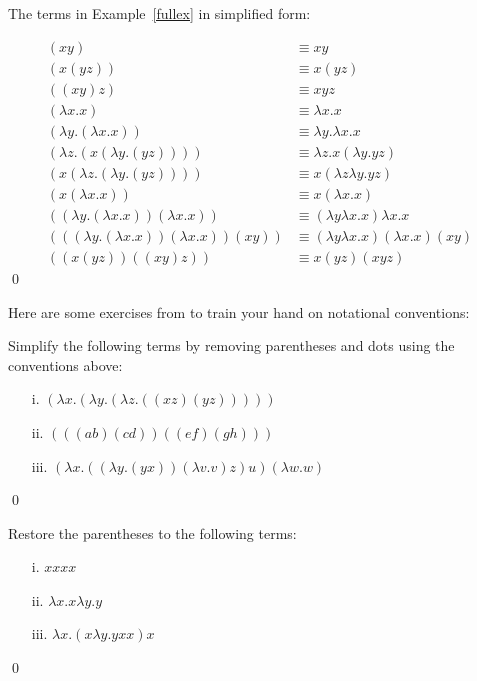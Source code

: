 \documentclass[11pt]{article}
\begin{document}
\begin{uexample}
The terms in Example~\ref{fullex} in simplified form:

\begin{align*}
(xy) &\equiv xy\\
(x(yz)) &\equiv x(yz)\\
((xy)z) &\equiv xyz\\
(\lambda x.x) &\equiv \lambda x.x\\
(\lambda y.(\lambda x.x)) &\equiv \lambda y.\lambda x.x\\
(\lambda z.(x(\lambda y.(yz)))) &\equiv \lambda z.x(\lambda y.yz)\\
(x(\lambda z.(\lambda y.(yz)))) &\equiv x(\lambda z\lambda y.yz)\\
(x(\lambda x.x)) &\equiv x(\lambda x.x)\\
((\lambda y.(\lambda x.x))(\lambda x.x)) &\equiv (\lambda y\lambda x.x)\lambda x.x\\
(((\lambda y.(\lambda x.x))(\lambda x.x))(xy)) &\equiv (\lambda y\lambda x.x)(\lambda x.x)(xy)\\
((x(yz))((xy)z)) &\equiv x(yz)(xyz)
\end{align*}
\qed
\end{uexample}

Here are some exercises from \cite{selinger13} to train your hand on notational conventions:

\begin{uexercise}
Simplify the following terms by removing parentheses and dots using the conventions above:
\begin{itemize}
\item[i.] $(\lambda x.(\lambda y.(\lambda z.((xz)(yz)))))$
\item[ii.] $(((ab)(cd))((ef)(gh)))$
\item[iii.] $(\lambda x.((\lambda y.(yx))(\lambda v.v)z)u)(\lambda w.w)$
\end{itemize}
\qed
\end{uexercise}

\begin{uexercise}
Restore the parentheses to the following terms:
\begin{itemize}
\item[i.] $xxxx$  
\item[ii.] $\lambda x.x\lambda y.y$ 
\item[iii.] $\lambda x.(x\lambda y.yxx)x$ 
\end{itemize}
\qed
\end{uexercise}
\end{document}
